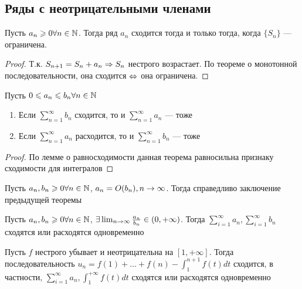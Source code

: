 \subsection{Ряды с неотрицательными членами}
\begin{lemma}
    Пусть \(a_n \geqslant 0 \forall n \in \mathbb{N}\). Тогда ряд \(a_n\) сходится тогда и только тогда, когда \(\{S_n\}\) --- ограничена.
\end{lemma}
\begin{proof}
    Т.к. \(S_{n+1} = S_n + a_n \Rightarrow S_n\) нестрого возрастает. По теореме о монотонной последовательности, она сходится \(\Leftrightarrow\) она ограничена.
\end{proof}
\begin{theorem}
    Пусть  \(0 \leqslant a_n \leqslant b_n \forall n \in \mathbb{N}\)
    \begin{enumerate}
        \item Если \(\sum_{n = 1}^\infty b_n\) сходится, то и \(\sum_{n = 1}^\infty a_n\) --- тоже
        \item Если \(\sum_{n = 1}^\infty a_n\) расходится, то и \(\sum_{n = 1}^\infty b_n\) --- тоже
    \end{enumerate}
\end{theorem}
\begin{proof}
    По лемме о равносходимости данная теорема равносильна признаку сходимости для интегралов
\end{proof}
\begin{corollary}
    Пусть \(a_n, b_n \geqslant 0 \forall n \in \mathbb{N}\), \(a_n = O(b_n), n\rightarrow \infty\). Тогда справедливо заключение предыдущей теоремы
\end{corollary}
\begin{corollary}
    Пусть \(a_n, b_n \geqslant 0 \forall n \in \mathbb{N}\), \(\exists \lim_{n\rightarrow\infty}\frac{a_n}{b_n} \in (0, +\infty)\). Тогда \(\sum_{i = 1}^\infty a_n, \sum_{i = 1}^\infty b_n\) сходятся или расходятся одновременно
\end{corollary}

\begin{theorem}
    Пусть \(f\) нестрого убывает и неотрицательна на \([1, +\infty]\). Тогда последовательность \(u_n = f(1) + \dots + f(n) - \int_{1}^{n+1}f(t)dt\) сходится, в частности, \(\sum_{i = 1}^\infty a_n, \int_{1}^{+\infty}f(t)dt\) сходятся или расходятся одновременно
\end{theorem}